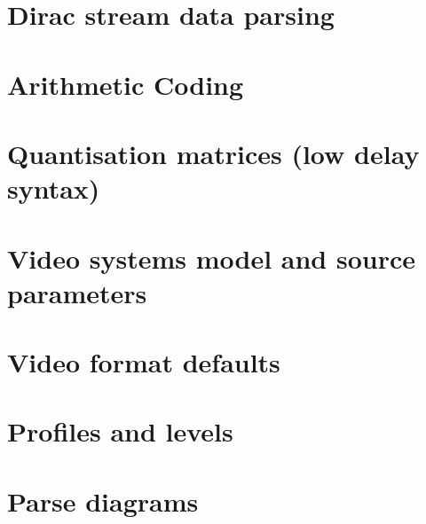 




\appendix
\section{Dirac stream data parsing}

\clearpage
\section{Arithmetic Coding}

\clearpage
\section{Quantisation matrices (low delay syntax)}


\clearpage
\section{Video systems model and source parameters}


\clearpage
\section{Video format defaults}

\clearpage
\section{Profiles and levels}

\clearpage
\section{Parse diagrams}

